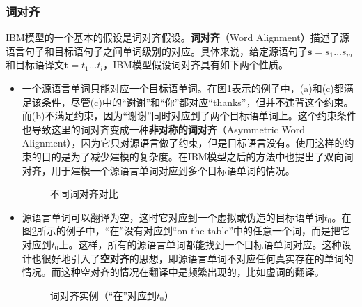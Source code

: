 
\subsubsection{词对齐}

\parinterval IBM模型的一个基本的假设是词对齐假设。{\small\sffamily\bfseries{词对齐}}（Word Alignment）描述了源语言句子和目标语句子之间单词级别的对应。具体来说，给定源语句子$\mathbf{s}=s_1...s_m$和目标语译文$\mathbf{t}=t_1...t_l$，IBM模型假设词对齐具有如下两个性质。

\begin{itemize}
\vspace{0.5em}
\item 一个源语言单词只能对应一个目标语单词。在图\ref{fig:3-15}表示的例子中，(a)和(c)都满足该条件，尽管(c)中的``谢谢''和``你''都对应``thanks''，但并不违背这个约束。而(b)不满足约束，因为``谢谢''同时对应到了两个目标语单词上。这个约束条件也导致这里的词对齐变成一种{\small\sffamily\bfseries{非对称的词对齐}}（Asymmetric Word Alignment），因为它只对源语言做了约束，但是目标语言没有。使用这样的约束的目的是为了减少建模的复杂度。在IBM模型之后的方法中也提出了双向词对齐，用于建模一个源语言单词对应到多个目标语单词的情况。

\begin{figure}[htp]
    \centering

\setlength{\belowcaptionskip}{-0.5em}
    \caption{不同词对齐对比}
    \label{fig:3-15}
\end{figure}

\item 源语言单词可以翻译为空，这时它对应到一个虚拟或伪造的目标语单词$t_0$。在图\ref{fig:3-16}所示的例子中，``在''没有对应到``on the table''中的任意一个词，而是把它对应到$t_0$上。这样，所有的源语言单词都能找到一个目标语单词对应。这种设计也很好地引入了{\small\sffamily\bfseries{空对齐}}的思想，即源语言单词不对应任何真实存在的单词的情况。而这种空对齐的情况在翻译中是频繁出现的，比如虚词的翻译。

\begin{figure}[htp]
    \centering

\setlength{\belowcaptionskip}{-0.5em}
    \caption{词对齐实例（``在''对应到$t_0$）}
    \label{fig:3-16}
\end{figure}
\end{itemize}

